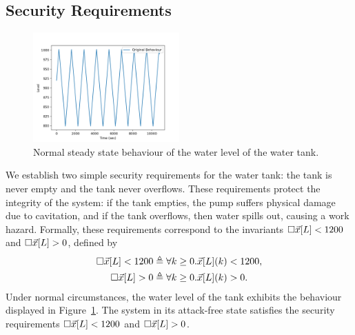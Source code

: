 \subsection*{Security Requirements}
 \begin{figure}
  \centering
  \includegraphics[width=0.5\textwidth]{Figures/Stage3Normal.png}
  \caption{Normal steady state behaviour of the water level of the water tank.}
  \label{fig:Stage3Normal}
 \end{figure}
We establish two simple security requirements for the water tank: the tank is never empty and the tank never overflows. These requirements protect the integrity of the system: if the tank empties, the pump suffers physical damage due to cavitation, and if the tank overflows, then water spills out, causing a work hazard. Formally, these requirements correspond to the invariants ${{\square}}{\vec{x}[L]< 1200}$ and ${{\square}}{\vec{x}[L]> 0}$, defined by
  \begin{align*}
    {{\square}}{\vec{x}[L]< 1200}&\triangleq \forall k\geq0.\vec{x}[L](k)< 1200,\\
    {{\square}}{\vec{x}[L]> 0}&\triangleq \forall k\geq0.\vec{x}[L](k)> 0.
  \end{align*}
Under normal circumstances, the water level of the tank exhibits the behaviour displayed in Figure~\ref{fig:Stage3Normal}. The system in its attack-free state satisfies the security requirements ${{\square}}{\vec{x}[L]< 1200}$ and ${{\square}}{\vec{x}[L]> 0}$.
